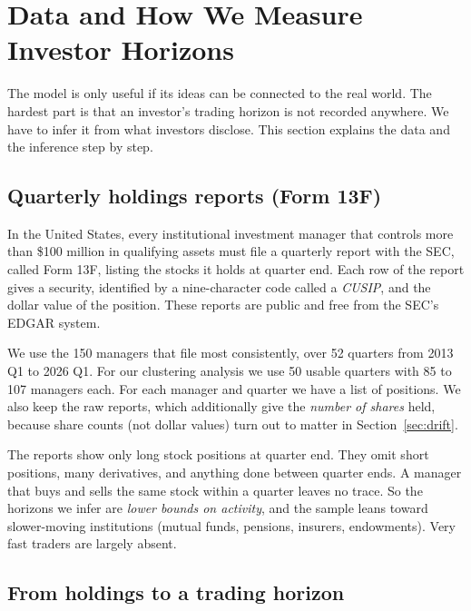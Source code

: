 \section{Data and How We Measure Investor Horizons}
\label{sec:data}

The model is only useful if its ideas can be connected to the real world. The hardest part is that an investor's trading horizon is not recorded anywhere. We have to infer it from what investors disclose. This section explains the data and the inference step by step.

\subsection{Quarterly holdings reports (Form 13F)}

In the United States, every institutional investment manager that controls more than \$100 million in qualifying assets must file a quarterly report with the SEC, called Form 13F, listing the stocks it holds at quarter end. Each row of the report gives a security, identified by a nine-character code called a \emph{CUSIP}, and the dollar value of the position. These reports are public and free from the SEC's EDGAR system.

We use the 150 managers that file most consistently, over 52 quarters from 2013 Q1 to 2026 Q1. For our clustering analysis we use 50 usable quarters with 85 to 107 managers each. For each manager and quarter we have a list of positions. We also keep the raw reports, which additionally give the \emph{number of shares} held, because share counts (not dollar values) turn out to matter in Section~\ref{sec:drift}.

\begin{caution}
The reports show only long stock positions at quarter end. They omit short positions, many derivatives, and anything done between quarter ends. A manager that buys and sells the same stock within a quarter leaves no trace. So the horizons we infer are \emph{lower bounds on activity}, and the sample leans toward slower-moving institutions (mutual funds, pensions, insurers, endowments). Very fast traders are largely absent.
\end{caution}

\subsection{From holdings to a trading horizon}

